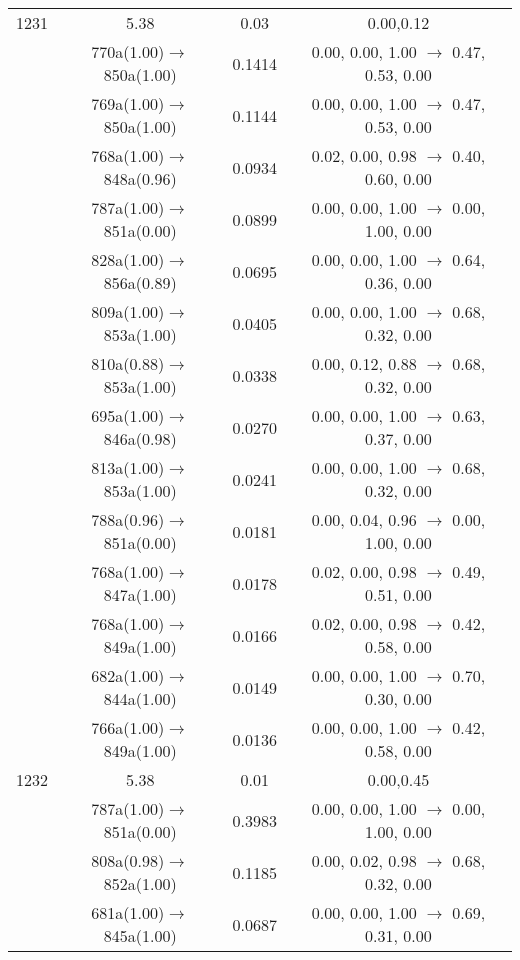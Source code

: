 \documentclass[10pt,a4paper]{article}
\begin{document}
\begin{longtable}{c|c|c|c}
 \hline1231 &	 5.38 &	 0.03 &	 0.00,0.12 \\ 
  	& 770a(1.00)$\rightarrow$850a(1.00) &	 0.1414 &	 0.00, 0.00, 1.00 $\rightarrow$ 0.47, 0.53, 0.00 \\ 
 	& 769a(1.00)$\rightarrow$850a(1.00) &	 0.1144 &	 0.00, 0.00, 1.00 $\rightarrow$ 0.47, 0.53, 0.00 \\ 
 	& 768a(1.00)$\rightarrow$848a(0.96) &	 0.0934 &	 0.02, 0.00, 0.98 $\rightarrow$ 0.40, 0.60, 0.00 \\ 
 	& 787a(1.00)$\rightarrow$851a(0.00) &	 0.0899 &	 0.00, 0.00, 1.00 $\rightarrow$ 0.00, 1.00, 0.00 \\ 
 	& 828a(1.00)$\rightarrow$856a(0.89) &	 0.0695 &	 0.00, 0.00, 1.00 $\rightarrow$ 0.64, 0.36, 0.00 \\ 
 	& 809a(1.00)$\rightarrow$853a(1.00) &	 0.0405 &	 0.00, 0.00, 1.00 $\rightarrow$ 0.68, 0.32, 0.00 \\ 
 	& 810a(0.88)$\rightarrow$853a(1.00) &	 0.0338 &	 0.00, 0.12, 0.88 $\rightarrow$ 0.68, 0.32, 0.00 \\ 
 	& 695a(1.00)$\rightarrow$846a(0.98) &	 0.0270 &	 0.00, 0.00, 1.00 $\rightarrow$ 0.63, 0.37, 0.00 \\ 
 	& 813a(1.00)$\rightarrow$853a(1.00) &	 0.0241 &	 0.00, 0.00, 1.00 $\rightarrow$ 0.68, 0.32, 0.00 \\ 
 	& 788a(0.96)$\rightarrow$851a(0.00) &	 0.0181 &	 0.00, 0.04, 0.96 $\rightarrow$ 0.00, 1.00, 0.00 \\ 
 	& 768a(1.00)$\rightarrow$847a(1.00) &	 0.0178 &	 0.02, 0.00, 0.98 $\rightarrow$ 0.49, 0.51, 0.00 \\ 
 	& 768a(1.00)$\rightarrow$849a(1.00) &	 0.0166 &	 0.02, 0.00, 0.98 $\rightarrow$ 0.42, 0.58, 0.00 \\ 
 	& 682a(1.00)$\rightarrow$844a(1.00) &	 0.0149 &	 0.00, 0.00, 1.00 $\rightarrow$ 0.70, 0.30, 0.00 \\ 
 	& 766a(1.00)$\rightarrow$849a(1.00) &	 0.0136 &	 0.00, 0.00, 1.00 $\rightarrow$ 0.42, 0.58, 0.00 \\ 
 \hline1232 &	 5.38 &	 0.01 &	 0.00,0.45 \\ 
  	& 787a(1.00)$\rightarrow$851a(0.00) &	 0.3983 &	 0.00, 0.00, 1.00 $\rightarrow$ 0.00, 1.00, 0.00 \\ 
 	& 808a(0.98)$\rightarrow$852a(1.00) &	 0.1185 &	 0.00, 0.02, 0.98 $\rightarrow$ 0.68, 0.32, 0.00 \\ 
 	& 681a(1.00)$\rightarrow$845a(1.00) &	 0.0687 &	 0.00, 0.00, 1.00 $\rightarrow$ 0.69, 0.31, 0.00 \\ 

\end{longtable}
\end{document}
